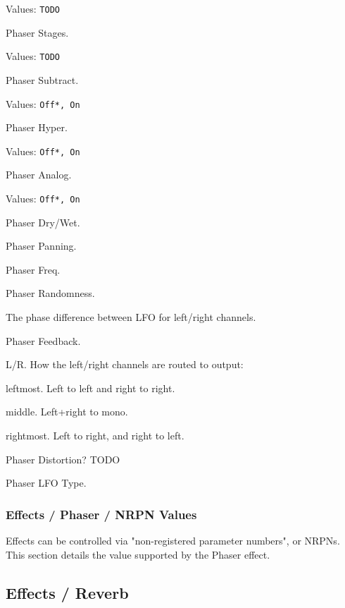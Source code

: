    Values: \texttt{TODO}

   Phaser Stages.

   Values: \texttt{TODO}

   Phaser Subtract.

   Values: \texttt{Off*, On}

   Phaser Hyper.

   Values: \texttt{Off*, On}

   Phaser Analog.

   Values: \texttt{Off*, On}

   Phaser Dry/Wet.

   Phaser Panning.

   Phaser Freq.

   Phaser Randomness.

   The phase difference between LFO for left/right channels.

   Phaser Feedback.

   L/R. How the left/right channels are routed to output:

      \begin{enumber}
         \item leftmost. Left to left and right to right.
         \item middle. Left+right to mono.
         \item rightmost. Left to right, and right to left.
      \end{enumber}

   Phaser Distortion? TODO

   Phaser LFO Type.

\subsubsection{Effects / Phaser / NRPN Values}
\label{subsubsec:effects_edit_phaser_nrpn}

Effects can be controlled via "non-registered parameter numbers", or NRPNs.
This section details the value supported by the Phaser effect.

\subsection{Effects / Reverb}
\label{subsec:effects_edit_reverb}

